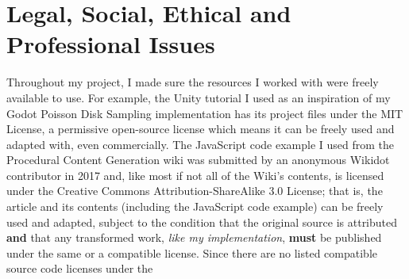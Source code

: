\chapter{Legal, Social, Ethical and Professional Issues} \label{Issues}


Throughout my project, I made sure the resources I worked with were freely available to use.
For example, the Unity tutorial I used as an inspiration of my Godot Poisson Disk Sampling implementation\cite{seblaguetuteYT} has its project files under the MIT License\cite{seblaguetuteGH}, a permissive open-source license which means it can be freely used and adapted with, even commercially.
The JavaScript code example I used from the Procedural Content Generation wiki was submitted by an anonymous Wikidot contributor in 2017 and, like most if not all of the Wiki's contents, is licensed under the Creative Commons Attribution-ShareAlike 3.0 License; that is, the article and its contents (including the JavaScript code example) can be freely used and adapted, subject to the condition that the original source is attributed \textbf{and} that any transformed work, \textit{like my implementation}, \textbf{must} be published under the same or a compatible license. Since there are no listed compatible source code licenses under the   
